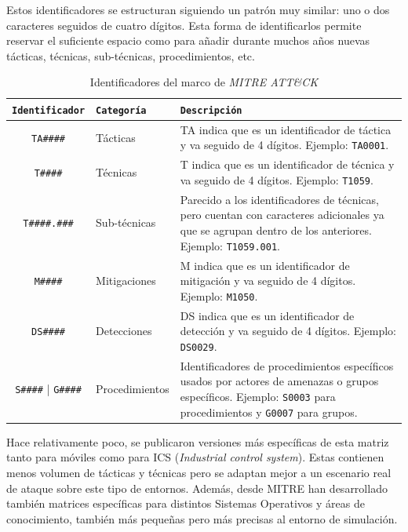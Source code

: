 Estos identificadores se estructuran siguiendo un patrón muy similar: uno o dos caracteres seguidos de cuatro dígitos. Esta forma de identificarlos permite reservar el suficiente espacio como para añadir durante muchos años nuevas tácticas, técnicas, sub-técnicas, procedimientos, etc.

\begin{table}[h]
\centering
\footnotesize
\begin{tabular}{|c|l|p{8cm}|}
\hline
\rowcolor{graylight}\texttt{Identificador} & \texttt{Categoría} & \texttt{Descripción} \\
\hline
\texttt{TA\#\#\#\#} & Tácticas & TA indica que es un identificador de táctica y va seguido de 4 dígitos. Ejemplo: \texttt{TA0001}. \\
\hline
\texttt{T\#\#\#\#} & Técnicas & T indica que es un identificador de técnica y va seguido de 4 dígitos. Ejemplo: \texttt{T1059}. \\
\hline
\texttt{T\#\#\#\#.\#\#\#} & Sub-técnicas & Parecido a los identificadores de técnicas, pero cuentan con caracteres adicionales ya que se agrupan dentro de los anteriores. Ejemplo: \texttt{T1059.001}. \\
\hline
\texttt{M\#\#\#\#} & Mitigaciones & M indica que es un identificador de mitigación y va seguido de 4 dígitos. Ejemplo: \texttt{M1050}. \\
\hline
\texttt{DS\#\#\#\#} & Detecciones & DS indica que es un identificador de detección y va seguido de 4 dígitos. Ejemplo: \texttt{DS0029}. \\
\hline
\texttt{S\#\#\#\#} | \texttt{G\#\#\#\#} & Procedimientos & Identificadores de procedimientos específicos usados por actores de amenazas o grupos específicos. Ejemplo: \texttt{S0003} para procedimientos y \texttt{G0007} para grupos. \\
\hline
\end{tabular}
\caption{Identificadores del marco de \textit{MITRE ATT\&CK}}
\label{tab:mitre_attack_identifiers}
\end{table}

Hace relativamente poco, se publicaron versiones más específicas de esta matriz tanto para móviles como para \gls{ICS} (\textit{Industrial control system}). Estas contienen menos volumen de tácticas y técnicas pero se adaptan mejor a un escenario real de ataque sobre este tipo de entornos. Además, desde MITRE han desarrollado también matrices específicas para distintos Sistemas Operativos y áreas de conocimiento, también más pequeñas pero más precisas al entorno de simulación.

